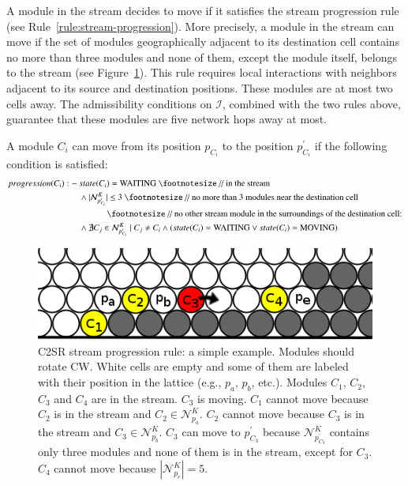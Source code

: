 A module in the stream decides to move if it satisfies the stream progression rule (see Rule~\ref{rule:stream-progression}). More precisely, a module in the stream can move if the set of modules geographically adjacent to its destination cell contains no more than three modules and none of them, except the module itself, belongs to the stream (see Figure~\ref{fig:reconfiguration:progression}). This rule requires local interactions with neighbors adjacent to its source and destination positions. These modules are at most two cells away. The admissibility conditions on $\mathcal{I}$, combined with the two rules above, guarantee that these modules are five network hops away at most.

\begin{myRule}
	\label{rule:stream-progression}
	A module $C_i$ can move from its position $p_{C_i}$ to the position $p^{\prime}_{C_i}$ if the following condition is satisfied:
	\begin{align*}
	progression(C_i) :-\ & state(C_i) = \text{WAITING}\ \text{\footnotesize // in the stream}\\
	& \land |\mathcal{N}^{K}_{p^{\prime}_{C_i}}| \leq 3 \ \text{\footnotesize // no more than 3 modules near the destination cell}\\
	& \text{~~~~~~~~~~~~~\footnotesize // no other stream module in the surroundings of the destination cell:}\\
	& \land \nexists C_j \in \mathcal{N}^{K}_{p^{\prime}_{C_i}}\mid  C_j \neq C_i \land (state(C_i) = \text{WAITING} \lor state(C_i) = \text{MOVING})
	\end{align*}
\end{myRule}

\begin{figure}[!h]
	\centering
	\includegraphics[width=0.7\linewidth]{images/reconfiguration/progression}
	\caption{C2SR stream progression rule: a simple example. Modules should rotate CW. White cells are empty and some of them are labeled with their position in the lattice (e.g., $p_a$, $p_b$, etc.). Modules $C_1$, $C_2$, $C_3$ and $C_4$ are in the stream. $C_3$ is moving. $C_1$ cannot move because $C_2$ is in the stream and $C_2 \in \mathcal{N}^{K}_{p_a}$. $C_2$ cannot move because $C_3$ is in the stream and $C_3 \in \mathcal{N}^{K}_{p_b}$. $C_3$ can move to $p^{\prime}_{C_3}$ because $\mathcal{N}^{K}_{p^{\prime}_{C_3}}$ contains only three modules and none of them is in the stream, except for $C_3$. $C_4$ cannot move because $|\mathcal{N}^{K}_{p_e}| = 5$.}
	\label{fig:reconfiguration:progression}
\end{figure}

